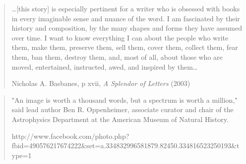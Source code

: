 

\mainmatter

\begin{quote}

\ldots [this story] is especially pertinent for a writer who is
obsessed with books in every imaginable sense and nuance of the
word. I am fascinated by their history and composition, by the many
shapes and forms they have assumed over time. I want to know
everything I can about the people who write them, make them, preserve
them, sell them, cover them, collect them, fear them, ban them,
destroy them, and, most of all, about those who are moved,
entertained, instructed, awed, and inspired by them\ldots

         Nicholas A. Basbanes, p xvii, {\it A Splendor of Letters} (2003)\cite{basbanes:2003}
\end{quote}


\begin{quote}

"An image is worth a thousand words, but a spectrum is worth a
million," said lead author Ben R. Oppenheimer, associate curator and
chair of the Astrophysics Department at the American Museum of
Natural History.

http://www.facebook.com/photo.php?fbid=490576217674222&set=a.334832996581879.82450.334816523250193&type=1
\end{quote}

\backmatter





